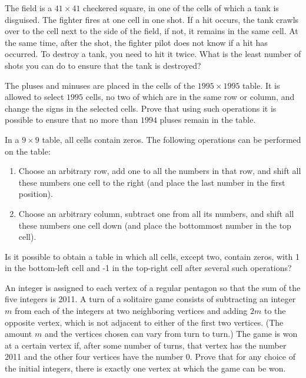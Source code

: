 \begin{problem} 
    The field is a $41 \times 41$ checkered square, in one of the cells of which a tank is disguised. The fighter fires at one cell in one shot. If a hit occurs, the tank crawls over to the cell next to the side of the field, if not, it remains in the same cell. At the same time, after the shot, the fighter pilot does not know if a hit has occurred. To destroy a tank, you need to hit it twice. What is the least number of shots you can do to ensure that the tank is destroyed?
\end{problem}

\begin{problem} 
    The pluses and minuses are placed in the cells of the  $1995 \times 1995$ table. It is allowed to select $1995$ cells, no two of which are in the same row or column, and change the signs in the selected cells. Prove that using such operations it is possible to ensure that no more than $1994$ pluses remain in the table.
\end{problem}

\begin{problem} 
    In a $9\times 9$ table, all cells contain zeros. The following operations can be performed on the table:
    \begin{enumerate}
        \item Choose an arbitrary row, add one to all the numbers in that row, and shift all these numbers one cell to the right (and place the last number in the first position).
        \item Choose an arbitrary column, subtract one from all its numbers, and shift all these numbers one cell down (and place the bottommost number in the top cell).
    \end{enumerate}
    Is it possible to obtain a table in which all cells, except two, contain zeros, with 1 in the bottom-left cell and -1 in the top-right cell after several such operations?
\end{problem}

\begin{problem} [USAMO 2011]
    An integer is assigned to each vertex of a regular pentagon so that the sum of the five integers is 2011. A turn of a solitaire game consists of subtracting an integer $m$ from each of the integers at two neighboring vertices and adding $2m$ to the opposite vertex, which is not adjacent to either of the first two vertices. (The amount $m$ and the vertices chosen can vary from turn to turn.) The game is won at a certain vertex if, after some number of turns, that vertex has the number 2011 and the other four vertices have the number 0. Prove that for any choice of the initial integers, there is exactly one vertex at which the game can be won.
\end{problem}

